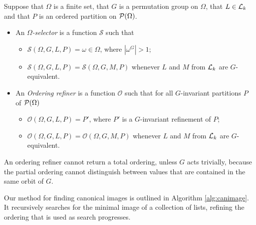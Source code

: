 \begin{defi} \label{def:algparts}
Suppose that $\Omega$ is a finite set, that $G$ is a permutation group on $\Omega$,
that $L \in \mathcal{L}_k$ and that $P$ is an ordered partition on $\mathcal{P}({\Omega})$.

  \begin{itemize}
  \item An \emph{$\Omega$-selector} is a function $\mathcal{S}$ such that
    \begin{itemize}
    \item $\mathcal{S}(\Omega, G, L, P) = \omega \in \Omega$, where $|\omega^G| > 1$;
    \item $\mathcal{S}(\Omega, G, L, P) = \mathcal{S}(\Omega, G, M, P)$ whenever
      $L$ and $M$ from $\mathcal{L}_k$ are $G$-equivalent.
    \end{itemize}

  \item An \emph{Ordering refiner} is a function $\mathcal{O}$ such that for
    all $G$-invariant partitions $P$ of $\mathcal{P}{({\Omega})}$
    \begin{itemize}
    \item $\mathcal{O}(\Omega, G, L, P) = P'$, where $P'$ is a $G$-invariant
      refinement of $P$;
    \item $\mathcal{O}(\Omega, G, L, P) = \mathcal{O}(\Omega, G, M, P)$ whenever
      $L$ and $M$ from $\mathcal{L}_k$ are $G$-equivalent.
    \end{itemize}
   \end{itemize}
 \end{defi}

An ordering refiner cannot return a total ordering, unless $G$ acts trivially,
because the partial ordering cannot distinguish between values that are contained in the same orbit of $G$.

Our method for finding canonical images is outlined in Algorithm \ref{alg:canimage}. It recursively searches for the minimal image of a collection of lists,
refining the ordering that is used as search progresses.

